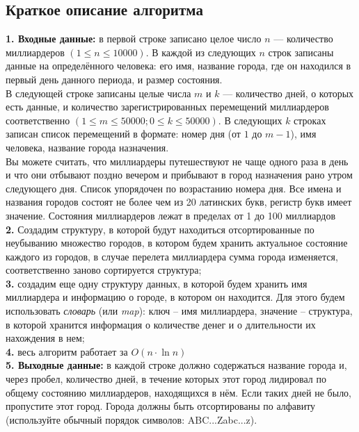 \documentclass[a5paper, 10pt]{article}
\theoremstyle{definition}
\theoremstyle{plain}
\theoremstyle{remark}
\begin{document}
\subsection{Краткое описание алгоритма}
\textbf{1. Входные данные:} в первой строке записано целое число $n$ — количество миллиардеров $(1 \leq n \leq 10000)$. В каждой из следующих $n$ строк записаны данные на определённого человека: его имя, название города, где он находился в первый день данного периода, и размер состояния. \\

В следующей строке записаны целые числа $m$ и $k$ — количество дней, о которых есть данные, и количество зарегистрированных перемещений миллиардеров соответственно $(1 \leq m \leq 50000; 0 \leq k \leq 50000)$. В следующих $k$ строках записан список перемещений в формате: номер дня (от $1$ до $m - 1$), имя человека, название города назначения.\\

 Вы можете считать, что миллиардеры путешествуют не чаще одного раза в день и что они отбывают поздно вечером и прибывают в город назначения рано утром следующего дня. Список упорядочен по возрастанию номера дня. Все имена и названия городов состоят не более чем из 20 латинских букв, регистр букв имеет значение. Состояния миллиардеров лежат в пределах от 1 до 100 миллиардов \\

\textbf{2.}  Создадим структуру, в которой будут находиться отсортированные по неубыванию множество городов, в котором будем хранить актуальное состояние каждого из городов, в случае перелета миллиардера сумма города изменяется, соответственно заново сортируется структура;\\

\textbf{3.}  создадим еще одну структуру данных, в которой будем хранить имя миллиардера и информацию о городе, в котором он находится. Для этого будем использовать \textit{словарь} (или \textit{map}): ключ -- имя миллиардера, значение -- структура, в которой хранится информация о количестве денег и о длительности их нахождения в нем;\\

\textbf{4.} весь алгоритм работает за $O(n \cdot \ln n)$\\

\textbf{5. Выходные данные:} в каждой строке должно содержаться название города и, через пробел, количество дней, в течение которых этот город лидировал по общему состоянию миллиардеров, находящихся в нём. Если таких дней не было, пропустите этот город. Города должны быть отсортированы по алфавиту (используйте обычный порядок символов: ABC...Zabc...z). 
\end{document}
